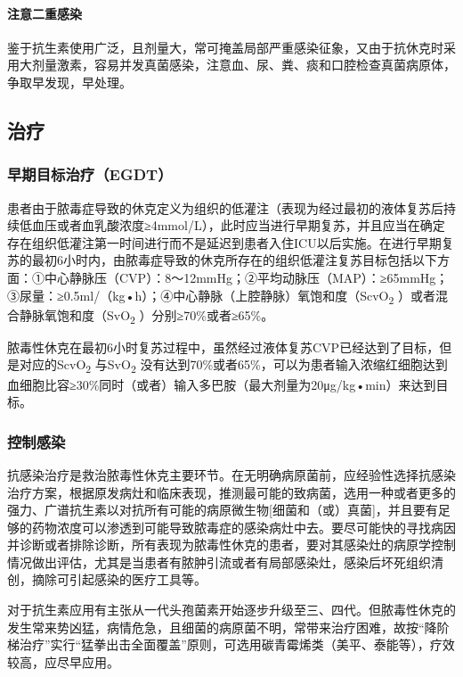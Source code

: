 \paragraph{注意二重感染}

鉴于抗生素使用广泛，且剂量大，常可掩盖局部严重感染征象，又由于抗休克时采用大剂量激素，容易并发真菌感染，注意血、尿、粪、痰和口腔检查真菌病原体，争取早发现，早处理。

\subsection{治疗}

\subsubsection{早期目标治疗（EGDT）}

患者由于脓毒症导致的休克定义为组织的低灌注（表现为经过最初的液体复苏后持续低血压或者血乳酸浓度≥4mmol/L），此时应当进行早期复苏，并且应当在确定存在组织低灌注第一时间进行而不是延迟到患者入住ICU以后实施。在进行早期复苏的最初6小时内，由脓毒症导致的休克所存在的组织低灌注复苏目标包括以下方面：①中心静脉压（CVP）：8～12mmHg；②平均动脉压（MAP）：≥65mmHg；③尿量：≥0.5ml/（kg•h）；④中心静脉（上腔静脉）氧饱和度（ScvO\textsubscript{2}
）或者混合静脉氧饱和度（SvO\textsubscript{2} ）分别≥70\%或者≥65\%。

脓毒性休克在最初6小时复苏过程中，虽然经过液体复苏CVP已经达到了目标，但是对应的ScvO\textsubscript{2}
与SvO\textsubscript{2}
没有达到70\%或者65\%，可以为患者输入浓缩红细胞达到血细胞比容≥30\%同时（或者）输入多巴胺（最大剂量为20μg/kg•min）来达到目标。

\subsubsection{控制感染}

抗感染治疗是救治脓毒性休克主要环节。在无明确病原菌前，应经验性选择抗感染治疗方案，根据原发病灶和临床表现，推测最可能的致病菌，选用一种或者更多的强力、广谱抗生素以对抗所有可能的病原微生物{[}细菌和（或）真菌{]}，并且要有足够的药物浓度可以渗透到可能导致脓毒症的感染病灶中去。要尽可能快的寻找病因并诊断或者排除诊断，所有表现为脓毒性休克的患者，要对其感染灶的病原学控制情况做出评估，尤其是当患者有脓肿引流或者有局部感染灶，感染后坏死组织清创，摘除可引起感染的医疗工具等。

对于抗生素应用有主张从一代头孢菌素开始逐步升级至三、四代。但脓毒性休克的发生常来势凶猛，病情危急，且细菌的病原菌不明，常带来治疗困难，故按“降阶梯治疗”实行“猛拳出击全面覆盖”原则，可选用碳青霉烯类（美平、泰能等），疗效较高，应尽早应用。


